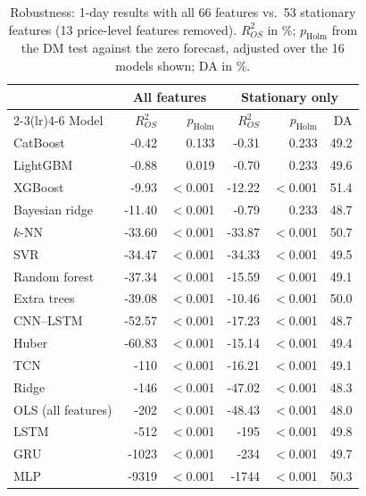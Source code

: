\begin{table}[t]
\centering
\caption{Robustness: 1-day results with all 66 features vs.\ 53 stationary features (13 price-level features removed). $R^2_{OS}$ in \%; $p_{\mathrm{Holm}}$ from the DM test against the zero forecast, adjusted over the 16 models shown; DA in \%.}
\label{tab:robust}
\footnotesize
\setlength{\tabcolsep}{3.5pt}
\begin{tabular}{lrrrrr}
\toprule
 & \multicolumn{2}{c}{All features} & \multicolumn{3}{c}{Stationary only} \\
\cmidrule(lr){2-3}\cmidrule(lr){4-6}
Model & $R^2_{OS}$ & $p_{\mathrm{Holm}}$ & $R^2_{OS}$ & $p_{\mathrm{Holm}}$ & DA \\
\midrule
CatBoost & -0.42 & 0.133 & -0.31 & 0.233 & 49.2 \\
LightGBM & -0.88 & 0.019 & -0.70 & 0.233 & 49.6 \\
XGBoost & -9.93 & $<$0.001 & -12.22 & $<$0.001 & 51.4 \\
Bayesian ridge & -11.40 & $<$0.001 & -0.79 & 0.233 & 48.7 \\
$k$-NN & -33.60 & $<$0.001 & -33.87 & $<$0.001 & 50.7 \\
SVR & -34.47 & $<$0.001 & -34.33 & $<$0.001 & 49.5 \\
Random forest & -37.34 & $<$0.001 & -15.59 & $<$0.001 & 49.1 \\
Extra trees & -39.08 & $<$0.001 & -10.46 & $<$0.001 & 50.0 \\
CNN--LSTM & -52.57 & $<$0.001 & -17.23 & $<$0.001 & 48.7 \\
Huber & -60.83 & $<$0.001 & -15.14 & $<$0.001 & 49.4 \\
TCN & -110 & $<$0.001 & -16.21 & $<$0.001 & 49.1 \\
Ridge & -146 & $<$0.001 & -47.02 & $<$0.001 & 48.3 \\
OLS (all features) & -202 & $<$0.001 & -48.43 & $<$0.001 & 48.0 \\
LSTM & -512 & $<$0.001 & -195 & $<$0.001 & 49.8 \\
GRU & -1023 & $<$0.001 & -234 & $<$0.001 & 49.7 \\
MLP & -9319 & $<$0.001 & -1744 & $<$0.001 & 50.3 \\
\bottomrule
\end{tabular}
\end{table}
